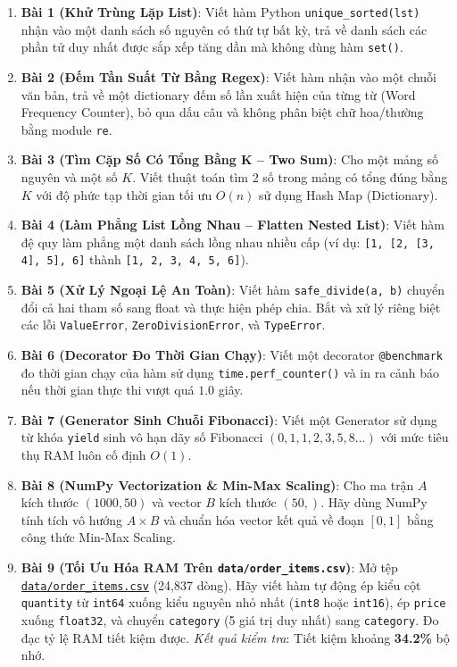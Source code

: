 \begin{baitapbox}
\begin{enumerate}
    \item \textbf{Bài 1 (Khử Trùng Lặp List)}: Viết hàm Python \texttt{unique\_sorted(lst)} nhận vào một danh sách số nguyên có thứ tự bất kỳ, trả về danh sách các phần tử duy nhất được sắp xếp tăng dần mà không dùng hàm \texttt{set()}.
    \item \textbf{Bài 2 (Đếm Tần Suất Từ Bằng Regex)}: Viết hàm nhận vào một chuỗi văn bản, trả về một dictionary đếm số lần xuất hiện của từng từ (Word Frequency Counter), bỏ qua dấu câu và không phân biệt chữ hoa/thường bằng module \texttt{re}.
    \item \textbf{Bài 3 (Tìm Cặp Số Có Tổng Bằng K -- Two Sum)}: Cho một mảng số nguyên và một số $K$. Viết thuật toán tìm 2 số trong mảng có tổng đúng bằng $K$ với độ phức tạp thời gian tối ưu $O(n)$ sử dụng Hash Map (Dictionary).
    \item \textbf{Bài 4 (Làm Phẳng List Lồng Nhau -- Flatten Nested List)}: Viết hàm đệ quy làm phẳng một danh sách lồng nhau nhiều cấp (ví dụ: \texttt{[1, [2, [3, 4], 5], 6]} thành \texttt{[1, 2, 3, 4, 5, 6]}).
    \item \textbf{Bài 5 (Xử Lý Ngoại Lệ An Toàn)}: Viết hàm \texttt{safe\_divide(a, b)} chuyển đổi cả hai tham số sang float và thực hiện phép chia. Bắt và xử lý riêng biệt các lỗi \texttt{ValueError}, \texttt{ZeroDivisionError}, và \texttt{TypeError}.
    \item \textbf{Bài 6 (Decorator Đo Thời Gian Chạy)}: Viết một decorator \texttt{@benchmark} đo thời gian chạy của hàm sử dụng \lstinline|time.perf_counter()| và in ra cảnh báo nếu thời gian thực thi vượt quá $1.0$ giây.
    \item \textbf{Bài 7 (Generator Sinh Chuỗi Fibonacci)}: Viết một Generator sử dụng từ khóa \texttt{yield} sinh vô hạn dãy số Fibonacci $(0, 1, 1, 2, 3, 5, 8...)$ với mức tiêu thụ RAM luôn cố định $O(1)$.
    \item \textbf{Bài 8 (NumPy Vectorization \& Min-Max Scaling)}: Cho ma trận $A$ kích thước $(1000, 50)$ và vector $B$ kích thước $(50,)$. Hãy dùng NumPy tính tích vô hướng $A \times B$ và chuẩn hóa vector kết quả về đoạn $[0, 1]$ bằng công thức Min-Max Scaling.
    \item \textbf{Bài 9 (Tối Ưu Hóa RAM Trên \texttt{data/order\_items.csv})}: Mở tệp \href{run:./data/order_items.csv}{\texttt{data/order\_items.csv}} (24,837 dòng). Hãy viết hàm tự động ép kiểu cột \texttt{quantity} từ \texttt{int64} xuống kiểu nguyên nhỏ nhất (\texttt{int8} hoặc \texttt{int16}), ép \texttt{price} xuống \texttt{float32}, và chuyển \texttt{category} (5 giá trị duy nhất) sang \texttt{category}. Đo đạc tỷ lệ RAM tiết kiệm được. \textit{Kết quả kiểm tra}: Tiết kiệm khoảng \textbf{34.2\%} bộ nhớ.

\end{enumerate}
\end{baitapbox}
